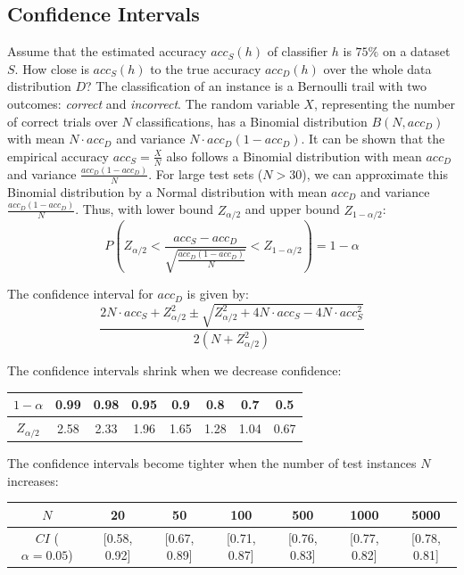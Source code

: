 \documentclass[12pt]{article}
\begin{document}
\subsection{Confidence Intervals} \label{app:conf}
Assume that the estimated accuracy $acc_S(h)$ of classifier $h$ is $75\%$ on a dataset $S$.
How close is $acc_S(h)$ to the true accuracy $acc_D(h)$ over the whole data distribution $D$?
The classification of an instance is a Bernoulli trail with two outcomes: \textit{correct} and \textit{incorrect}.
The random variable $X$, representing the number of correct trials over $N$ classifications, has a Binomial distribution $B(N, acc_D)$ with mean $N \cdot acc_D$ and variance $N \cdot acc_D (1 - acc_D)$.
It can be shown that the empirical accuracy $acc_S = \frac{X}{N}$ also follows a Binomial distribution with mean $acc_D$ and variance $\frac{acc_D (1 - acc_D)}{N}$.
For large test sets ($N > 30$), we can approximate this Binomial distribution by a Normal distribution with mean $acc_D$ and variance $\frac{acc_D (1 - acc_D)}{N}$.
Thus, with lower bound $Z_{\alpha / 2}$ and upper bound $Z_{1 - \alpha / 2}$:
\[ P \left( Z_{\alpha / 2} < \frac{acc_S - acc_D}{\sqrt{\frac{acc_D (1 - acc_D)}{N}}} < Z_{1 - \alpha / 2} \right) = 1 - \alpha \]

\noindent
The confidence interval for $acc_D$ is given by:
\[ \frac{2N \cdot acc_S + Z_{\alpha / 2}^2 \pm \sqrt{Z_{\alpha / 2}^2 + 4N \cdot acc_S - 4N \cdot acc_S^2}}{2 \left( N + Z_{\alpha / 2}^2 \right)} \]

\noindent
The confidence intervals shrink when we decrease confidence:

\begin{table}[h]
    \centering
    \begin{tabular}{c|ccccccc}
    $1 - \alpha$ & 0.99 & 0.98 & 0.95 & 0.9 & 0.8 & 0.7 & 0.5 \\ \hline
    $Z_{\alpha / 2}$ & 2.58 & 2.33 & 1.96 & 1.65 & 1.28 & 1.04 & 0.67
    \end{tabular}
\end{table}

\noindent
The confidence intervals become tighter when the number of test instances $N$ increases:

\begin{table}[h]
    \centering
    \begin{tabular}{c|cccccc}
    $N$ & 20 & 50 & 100 & 500 & 1000 & 5000 \\ \hline
    $CI$ ($\alpha = 0.05$) & [0.58, 0.92] & [0.67, 0.89] & [0.71, 0.87] & [0.76, 0.83] & [0.77, 0.82] & [0.78, 0.81]
    \end{tabular}
\end{table}
\end{document}
